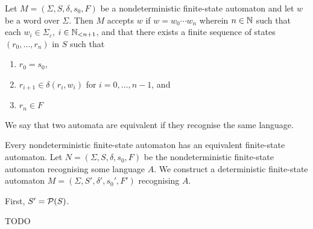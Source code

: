Let \(M = (\varSigma, S, \delta, s_0, F)\) be a nondeterministic finite-state
automaton and let \(w\) be a word over \(\varSigma\). Then \(M\) accepts \(w\)
if \(w = w_0 \cdots w_n\) wherein \(n \in \setnat\) such that each \(w_i \in
\varSigma_\varepsilon\), \(i \in \Nln[n + 1]\), and that there exists a finite
sequence of states \((r_0, \ldots, r_n)\) in \(S\) such that
\begin{enumerate}
    \item \(r_0 = s_0\),
    \item \(r_{i + 1} \in \delta(r_i, w_i)\) for \(i = 0, \ldots, n - 1\), and
    \item \(r_n \in F\)
\end{enumerate}

We say that two automata are equivalent if they recognise the same language.

\Bth
    Every nondeterministic finite-state automaton has an equivalent finite-state
    automaton.
\Eth
\Bpr
    Let \(N = (\varSigma, S, \delta, s_0, F)\) be the nondeterministic
    finite-state automaton recognising some language \(A\). We construct a
    deterministic finite-state automaton \(M = (\varSigma, S', \delta', s_0',
    F')\) recognising \(A\).

    First, \(S' = \pow(S)\).

    TODO
\Epr

\Edc